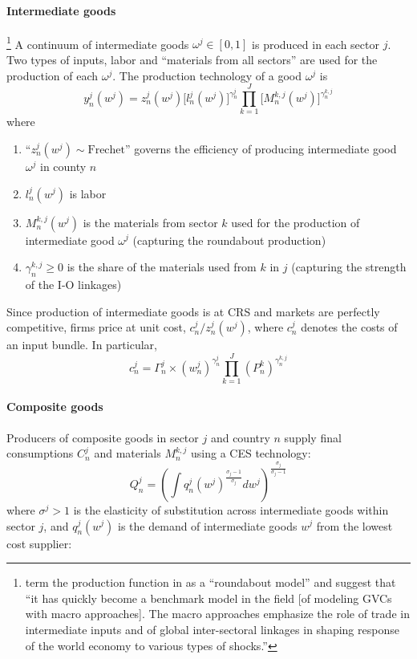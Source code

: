 \paragraph{Intermediate goods}%
\footnote{
    \cite{Antras:2022} term the production function in \cite{Caliendo:2015} as a ``roundabout model''
    and suggest that ``it has quickly become a benchmark model in the field [of modeling GVCs with macro approaches].
    The macro approaches emphasize the role of trade in intermediate inputs and of global inter-sectoral linkages 
    in shaping response of the world economy to various types of shocks.''
}
A continuum of intermediate goods $\omega^j \in [0, 1]$ is produced in each sector $j$.
Two types of inputs, labor and ``materials from all sectors'' are used for the 
production of each $\omega^j$.
The production technology of a good $\omega^j$ is 
\begin{equation}
    y_n^j(w^j) = z_n^j(w^j)\bigg[ l_n^j(w^j) \bigg]^{\gamma_n^j} \prod_{k=1}^J \bigg[ M_n^{k,j}(w^j) \bigg]^{\gamma_n^{k,j}}
\end{equation}
where
\begin{enumerate}
    \item ``$z_n^j(w^j) \sim \text{Frechet}$'' governs the efficiency of producing intermediate good $\omega^j$ in county $n$
    \item $l_n^j(w^j)$ is labor
    \item $M_n^{k,j}(w^j)$ is the materials from sector $k$ used for the production of intermediate good $\omega^j$ (capturing the roundabout production)
    \item $\gamma_n^{k,j} \geq 0$ is the share of the materials used from $k$ in $j$ (capturing the strength of the I-O linkages)
\end{enumerate}
Since production of intermediate goods is at CRS and markets are perfectly competitive,
firms price at unit cost, $c_n^j / z_n^j(w^j)$,
where $c_n^j$ denotes the costs of an input bundle.
In particular,
\begin{equation}
    c_n^j = \Gamma_n^j \times (w_n^j)^{\gamma_n^j} \prod_{k=1}^J (P_{n}^k)^{\gamma_n^{k,j}}
\end{equation}


\paragraph{Composite goods}%
Producers of composite goods in sector $j$ and country $n$ supply final consumptions $C_n^j$ and materials $M_n^{k,j}$
using a CES technology:
\begin{equation}
    Q_n^j = \left(\int q_n^j (w^j)^{\frac{\sigma_j-1}{\sigma_j}} d w^j \right)^{\frac{\sigma_j}{\sigma_j - 1}}
\end{equation}
where $\sigma^j > 1$ is the elasticity of substitution across intermediate goods within sector $j$,
and $q_n^j (w^j)$ is the demand of intermediate goods $w^j$ from the lowest cost supplier:
